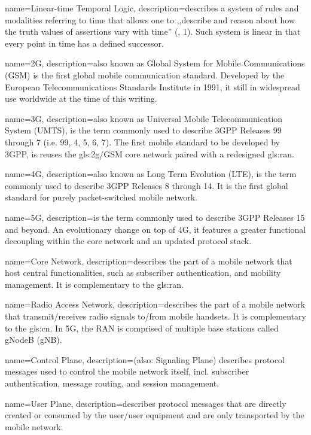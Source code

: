 {
    name={Linear-time Temporal Logic},
    description={describes a system of rules and modalities referring to time that allows one to ,,describe and reason about how the truth values of assertions vary
with time'' (\cite{emerson1990temporal}, 1). Such system is linear in that every point in time has a defined successor.}
}

{
    name={2G},
    description={also known as Global System for Mobile Communications (GSM) is the first global mobile communication standard. Developed by the European Telecommunications Standards Institute in 1991, it still in widespread use worldwide at the time of this writing.}
}

{
    name={3G},
    description={also known as Universal Mobile Telecommunication System (UMTS), is the term commonly used to describe 3GPP Releases 99 through 7 (i.e. 99, 4, 5, 6, 7). The first mobile standard to be developed by 3GPP, is reuses the \gls{gls:2g}/GSM core network paired with a redesigned \gls{gls:ran}.}
}

{
    name={4G},
    description={also known as Long Term Evolution (LTE), is the term commonly used to describe 3GPP Releases 8 through 14. It is the first global standard for purely packet-switched mobile network.}
}

{
    name={5G},
    description={is the term commonly used to describe 3GPP Releases 15 and beyond. An evolutionary change on top of 4G, it features a greater functional decoupling within the core network and an updated protocol stack.}
}

{
    name={Core Network},
    description={describes the part of a mobile network that host central functionalities, such as subscriber authentication, and mobility management. It is complementary to the \gls{gls:ran}.}
}

{
    name={Radio Access Network},
    description={describes the part of a mobile network that transmit/receives radio signals to/from mobile handsets. It is complementary to the \gls{gls:cn}. In 5G, the RAN is comprised of multiple base stations called gNodeB (gNB).}
}

{
    name={Control Plane},
    description={(also: Signaling Plane) describes protocol messages used to control the mobile network itself, incl. subscriber authentication, message routing, and session management.}
}

{
    name={User Plane},
    description={describes protocol messages that are directly created or consumed by the user/user equipment and are only transported by the mobile network.}
}